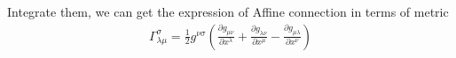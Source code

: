 Integrate them, we can get the expression of Affine connection in terms of metric
\begin{align}
    \Gamma^{\sigma}_{\lambda\mu}=\frac{1}{2}g^{\nu \sigma}\left(\frac{\partial g_{\mu\nu}}{\partial x^{\lambda}}+\frac{\partial g_{\lambda \nu}}{\partial x^{\mu}}-\frac{\partial g_{\mu\lambda}}{\partial x^{\nu}}\right)
\end{align}

